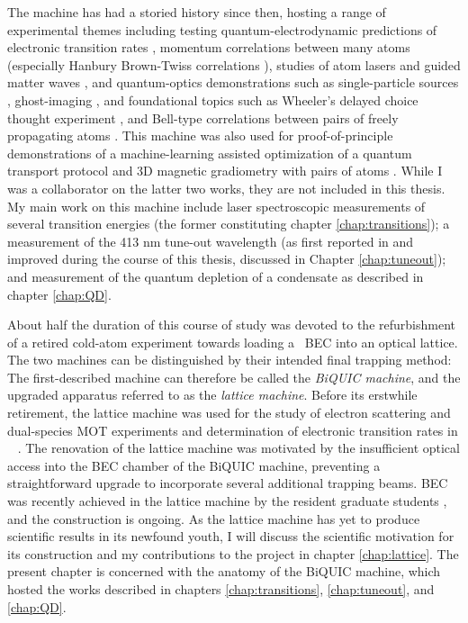 	The machine has had a storied history since then, hosting a range of experimental themes including testing quantum-electrodynamic predictions of electronic transition rates \cite{Dall08}, momentum correlations between many atoms \cite{Hodgman17,Dall13,Manning13} (especially Hanbury Brown-Twiss correlations \cite{Manning10,Dall11a,Hodgman11,Rugway11,Rugway13}), studies of atom lasers \cite{Dall07_laser,Dall08a,Henson18_BCR,Manning10} and guided matter waves \cite{Dall10, Dall11a,Dall11}, and quantum-optics demonstrations such as single-particle sources \cite{Manning14}, ghost-imaging \cite{Khakimov16,Hodgman19}, and foundational topics such as Wheeler's delayed choice thought experiment \cite{Manning15}, and Bell-type correlations between pairs of freely propagating atoms \cite{Shin19}.
	This machine was also used for proof-of-principle demonstrations of a machine-learning assisted optimization of a quantum transport protocol \cite{Henson18_ML} and 3D magnetic gradiometry with pairs of atoms \cite{Shin20}.
	While I was a collaborator on the latter two works, they are not included in this thesis.
	My main work on this machine include laser spectroscopic measurements of several transition energies \cite{Ross20,Thomas20} (the former constituting chapter \ref{chap:transitions}); a measurement of the 413 nm tune-out wavelength (as first reported in \cite{Henson15} and improved during the course of this thesis, discussed in Chapter \ref{chap:tuneout}); and measurement of the quantum depletion of a condensate as described in chapter \ref{chap:QD}.
	

	About half the duration of this course of study was devoted to the refurbishment of a retired cold-atom experiment towards loading a \mhe~BEC into an optical lattice.
	The two machines can be distinguished by their intended final trapping method: The first-described machine can therefore be called the \emph{BiQUIC machine}, and the upgraded apparatus referred to as the \emph{lattice machine}.
	Before its erstwhile retirement, the lattice machine was used for the study of electron scattering and  dual-species MOT experiments \cite{Uhlmann05,Byron10,Byron10a} and determination of electronic transition rates in \mhe~\cite{Hodgman09_23P} .
	The renovation of the lattice machine was motivated by the insufficient optical access into the BEC chamber of the BiQUIC machine, preventing a straightforward upgrade to incorporate several additional trapping beams.
	BEC was recently achieved in the lattice machine by the resident graduate students \cite{Abbas21}, and the construction is ongoing.
	As the lattice machine has yet to produce scientific results in its newfound youth, I will discuss the scientific motivation for its construction and my contributions to the project in chapter \ref{chap:lattice}.
	The present chapter is concerned with the anatomy of the BiQUIC machine, which hosted the works described in chapters \ref{chap:transitions}, \ref{chap:tuneout}, and \ref{chap:QD}.

